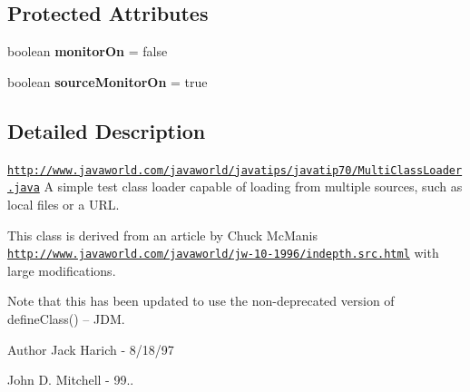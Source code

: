 \subsection*{Protected Attributes}
\begin{DoxyCompactItemize}
\item 
\hypertarget{class_c_a_s_u_a_l_1_1misc_1_1_multi_class_loader_a2f55c2f2447c43ada8c6b48431619717}{boolean {\bfseries monitor\-On} = false}\label{class_c_a_s_u_a_l_1_1misc_1_1_multi_class_loader_a2f55c2f2447c43ada8c6b48431619717}

\item 
\hypertarget{class_c_a_s_u_a_l_1_1misc_1_1_multi_class_loader_a696e5ad53268e127b0094e87f4fe16fe}{boolean {\bfseries source\-Monitor\-On} = true}\label{class_c_a_s_u_a_l_1_1misc_1_1_multi_class_loader_a696e5ad53268e127b0094e87f4fe16fe}

\end{DoxyCompactItemize}


\subsection{Detailed Description}
\href{http://www.javaworld.com/javaworld/javatips/javatip70/MultiClassLoader.java}{\tt http\-://www.\-javaworld.\-com/javaworld/javatips/javatip70/\-Multi\-Class\-Loader.\-java} A simple test class loader capable of loading from multiple sources, such as local files or a U\-R\-L.

This class is derived from an article by Chuck Mc\-Manis \href{http://www.javaworld.com/javaworld/jw-10-1996/indepth.src.html}{\tt http\-://www.\-javaworld.\-com/javaworld/jw-\/10-\/1996/indepth.\-src.\-html} with large modifications.

Note that this has been updated to use the non-\/deprecated version of define\-Class() -- J\-D\-M.

\begin{DoxyAuthor}{Author}
Jack Harich -\/ 8/18/97 

John D. Mitchell -\/ 99.. 
\end{DoxyAuthor}


